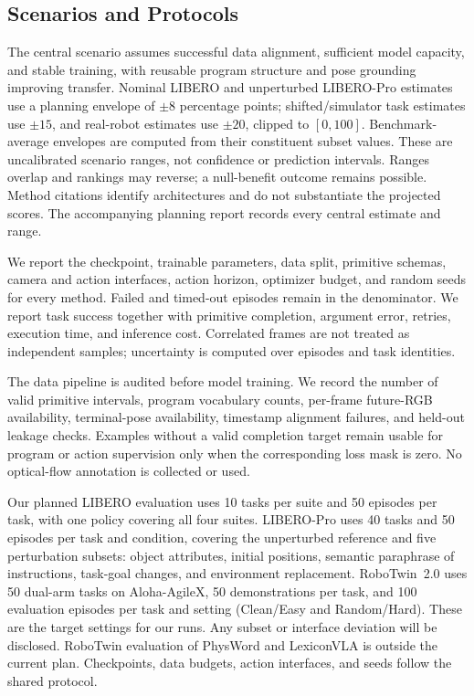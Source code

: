 \subsection{Scenarios and Protocols}
The central scenario assumes successful data alignment, sufficient model capacity, and stable training, with reusable program structure and pose grounding improving transfer. Nominal LIBERO and unperturbed LIBERO-Pro estimates use a planning envelope of $\pm8$ percentage points; shifted/simulator task estimates use $\pm15$, and real-robot estimates use $\pm20$, clipped to $[0,100]$. Benchmark-average envelopes are computed from their constituent subset values. These are uncalibrated scenario ranges, not confidence or prediction intervals. Ranges overlap and rankings may reverse; a null-benefit outcome remains possible. Method citations identify architectures and do not substantiate the projected scores. The accompanying planning report records every central estimate and range.

We report the checkpoint, trainable parameters, data split, primitive schemas, camera and action interfaces, action horizon, optimizer budget, and random seeds for every method. Failed and timed-out episodes remain in the denominator. We report task success together with primitive completion, argument error, retries, execution time, and inference cost. Correlated frames are not treated as independent samples; uncertainty is computed over episodes and task identities.

The data pipeline is audited before model training. We record the number of valid primitive intervals, program vocabulary counts, per-frame future-RGB availability, terminal-pose availability, timestamp alignment failures, and held-out leakage checks. Examples without a valid completion target remain usable for program or action supervision only when the corresponding loss mask is zero. No optical-flow annotation is collected or used.

Our planned LIBERO evaluation uses 10 tasks per suite and 50 episodes per task,
with one policy covering all four suites. LIBERO-Pro uses 40 tasks and 50
episodes per task and condition, covering the unperturbed reference and five
perturbation subsets: object attributes, initial positions, semantic paraphrase
of instructions, task-goal changes, and environment replacement. RoboTwin~2.0 uses 50 dual-arm tasks on Aloha-AgileX,
50 demonstrations per task, and 100 evaluation episodes per task and setting
(Clean/Easy and Random/Hard). These are the target settings for our runs. Any subset or interface deviation
will be disclosed. RoboTwin evaluation of PhysWord and LexiconVLA is outside
the current plan. Checkpoints, data budgets, action interfaces, and seeds follow
the shared protocol.
